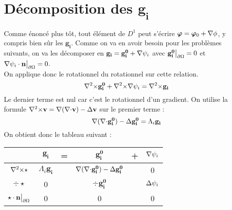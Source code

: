 \section{Décomposition des $\mathbf{g_i}$}
\label{decomp}

Comme énoncé plus tôt, tout élément de $D^1$ peut s'écrire $\bm{\varphi} = \bm{\varphi}_0 + {\nabla}\phi$, y compris bien sûr les $\mathbf{g_i}$. Comme on va en avoir besoin pour les problèmes suivants, on va les décomposer en $\mathbf{g_i}=\mathbf{g_i^0}+{\nabla}\psi_i$ avec $\mathbf{g_i^0}{\big\rvert_{\partial\Omega}} = 0$ et ${\nabla}\psi_i\cdot \mathbf{n}{\big\rvert_{\partial\Omega}} = 0$.\\
On applique donc le rotationnel du rotationnel sur cette relation.\\
\[ {\nabla^2\times} \mathbf{g_i^0} +{\nabla^2\times}{\nabla}\psi_i = {\nabla^2\times} \mathbf{g_i} \]
Le dernier terme est nul car c'est le rotationnel d'un gradient. On utilise la formule ${\nabla^2\times} \mathbf{v}={\nabla}({\nabla\cdot} \mathbf{v})-{\Delta} \mathbf{v}$ sur le premier terme :
\[ {\nabla}({\nabla\cdot} \mathbf{g_i^0})-{\Delta} \mathbf{g_i^0} = \Lambda_i \mathbf{g_i} \]
On obtient donc le tableau suivant :
\begin{center}
\begin{tabular}{c|ccccc}
& $\mathbf{g_i}$ & = & $\mathbf{g_i^0}$ & + & ${\nabla}\psi_i$ \\ \hline
${\nabla^2\times}\star$ & $\Lambda_i\mathbf{g_i}$ & & ${\nabla}({\nabla\cdot} \mathbf{g_i^0})-{\Delta} \mathbf{g_i^0}$ & & 0\\ \hline
$\div\star$ & 0 & & $\div \mathbf{g_i^0}$ & & ${\Delta}\psi_i$\\ \hline
$\star\cdot \mathbf{n}{\big\rvert_{\partial\Omega}}$ & 0 & & 0 & & 0
\end{tabular}
\end{center}

